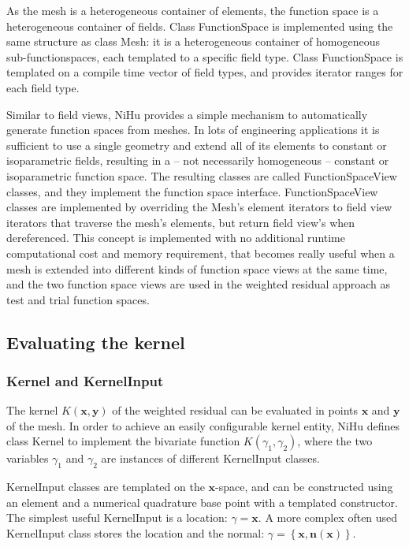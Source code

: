 \documentclass[review]{elsarticle}
\begin{document}
As the mesh is a heterogeneous container of elements, the function space is a heterogeneous container of fields.
Class FunctionSpace is implemented using the same structure as class Mesh: it is a heterogeneous container of homogeneous sub-functionspaces, each templated to a specific field type.
Class FunctionSpace is templated on a compile time vector of field types, and provides iterator ranges for each field type.

Similar to field views, NiHu provides a simple mechanism to automatically generate function spaces from meshes.
In lots of engineering applications it is sufficient to use a single geometry and extend all of its elements to constant or isoparametric fields, resulting in a -- not necessarily homogeneous -- constant or isoparametric function space.
The resulting classes are called FunctionSpaceView classes, and they implement the function space interface.
FunctionSpaceView classes are implemented by overriding the Mesh's element iterators to field view iterators that traverse the mesh's elements, but return field view's when dereferenced.
This concept is implemented with no additional runtime computational cost and memory requirement, that becomes really useful when a mesh is extended into different kinds of function space views at the same time, and the two function space views are used in the weighted residual approach as test and trial function spaces.


\subsection{Evaluating the kernel}


\subsubsection{Kernel and KernelInput}

The kernel $K(\bm{x},\bm{y})$ of the weighted residual can be evaluated in points $\bm{x}$ and $\bm{y}$ of the mesh.
In order to achieve an easily configurable kernel entity, NiHu defines class Kernel to implement the bivariate function $K(\gamma_1, \gamma_2)$, where the two variables $\gamma_1$ and $\gamma_2$ are instances of different KernelInput classes.

KernelInput classes are templated on the $\bm{x}$-space, and can be constructed using an element and a numerical quadrature base point with a templated constructor.
The simplest useful KernelInput is a location: $\gamma = \bm{x}$. A more complex often used KernelInput class stores the location and the normal: $\gamma = \left\{\bm{x}, \bm{n}(\bm{x}) \right\}$.
\end{document}
